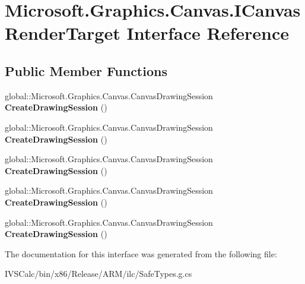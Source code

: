 \hypertarget{interface_microsoft_1_1_graphics_1_1_canvas_1_1_i_canvas_render_target}{}\section{Microsoft.\+Graphics.\+Canvas.\+I\+Canvas\+Render\+Target Interface Reference}
\label{interface_microsoft_1_1_graphics_1_1_canvas_1_1_i_canvas_render_target}
\subsection*{Public Member Functions}
\begin{DoxyCompactItemize}
\item 
\mbox{\label{interface_microsoft_1_1_graphics_1_1_canvas_1_1_i_canvas_render_target_acc4e3313d87d5f6bf101b158e92cea81}} 
global\+::\+Microsoft.\+Graphics.\+Canvas.\+Canvas\+Drawing\+Session {\bfseries Create\+Drawing\+Session} ()
\item 
\mbox{\label{interface_microsoft_1_1_graphics_1_1_canvas_1_1_i_canvas_render_target_acc4e3313d87d5f6bf101b158e92cea81}} 
global\+::\+Microsoft.\+Graphics.\+Canvas.\+Canvas\+Drawing\+Session {\bfseries Create\+Drawing\+Session} ()
\item 
\mbox{\label{interface_microsoft_1_1_graphics_1_1_canvas_1_1_i_canvas_render_target_acc4e3313d87d5f6bf101b158e92cea81}} 
global\+::\+Microsoft.\+Graphics.\+Canvas.\+Canvas\+Drawing\+Session {\bfseries Create\+Drawing\+Session} ()
\item 
\mbox{\label{interface_microsoft_1_1_graphics_1_1_canvas_1_1_i_canvas_render_target_acc4e3313d87d5f6bf101b158e92cea81}} 
global\+::\+Microsoft.\+Graphics.\+Canvas.\+Canvas\+Drawing\+Session {\bfseries Create\+Drawing\+Session} ()
\item 
\mbox{\label{interface_microsoft_1_1_graphics_1_1_canvas_1_1_i_canvas_render_target_acc4e3313d87d5f6bf101b158e92cea81}} 
global\+::\+Microsoft.\+Graphics.\+Canvas.\+Canvas\+Drawing\+Session {\bfseries Create\+Drawing\+Session} ()
\end{DoxyCompactItemize}


The documentation for this interface was generated from the following file\+:\begin{DoxyCompactItemize}
\item 
I\+V\+S\+Calc/bin/x86/\+Release/\+A\+R\+M/ilc/Safe\+Types.\+g.\+cs\end{DoxyCompactItemize}
